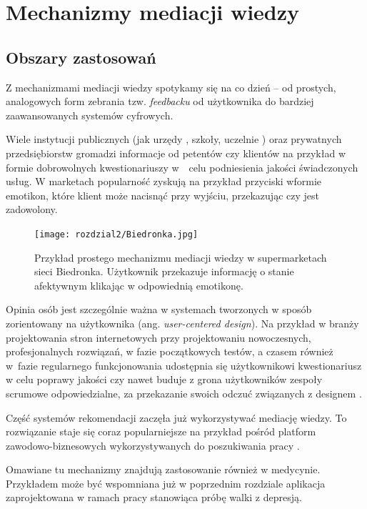 \chapter{Mechanizmy mediacji wiedzy}
\label{cha:mechanizmyMediacjiWiedzy}


\section{Obszary zastosowań}
\label{sec:obszaryZastosowan}

Z mechanizmami mediacji wiedzy spotykamy się na co dzień -- od prostych, analogowych form zebrania tzw. \textit{feedbacku} od użytkownika do bardziej zaawansowanych systemów cyfrowych.

Wiele instytucji publicznych (jak urzędy \cite{umkrakow}, szkoły, uczelnie \cite{wgigagh}) oraz prywatnych przedsiębiorstw gromadzi informacje od petentów czy klientów na przykład w formie dobrowolnych kwestionariuszy w~~celu podniesienia jakości świadczonych usług. W marketach popularność zyskują na przykład przyciski wformie emotikon, które klient może  nacisnąć przy wyjściu, przekazując czy jest zadowolony.

\begin{figure}[H]
	\centering
	\texttt{[image: rozdzial2/Biedronka.jpg]}
	\caption{Przykład prostego mechanizmu mediacji wiedzy w supermarketach sieci Biedronka. Użytkownik przekazuje informację o stanie afektywnym klikając w odpowiednią emotikonę.}
\end{figure}

	
Opinia osób jest szczególnie ważna w systemach tworzonych w sposób zorientowany na użytkownika (ang. \textit{user-centered design}). Na przykład w branży projektowania stron internetowych przy projektowaniu nowoczesnych, profesjonalnych rozwiązań, w fazie początkowych testów, a czasem również w~fazie regularnego funkcjonowania udostępnia się użytkownikowi kwestionariusz w celu poprawy jakości czy nawet buduje z grona użytkowników zespoły scrumowe odpowiedzialne, za przekazanie swoich odczuć związanych z designem \cite{uxdesign}.
	
Część systemów rekomendacji zaczęła już wykorzystywać mediację wiedzy. To rozwiązanie staje się coraz popularniejsze na przykład pośród platform zawodowo-biznesowych wykorzystywanych do poszukiwania pracy \cite{careerexplorer}.
	
Omawiane tu mechanizmy znajdują zastosowanie również w medycynie. Przykładem może być wspomniana już w poprzednim rozdziale aplikacja zaprojektowana w ramach pracy \cite{hung2016predicting} stanowiąca próbę walki z depresją.


